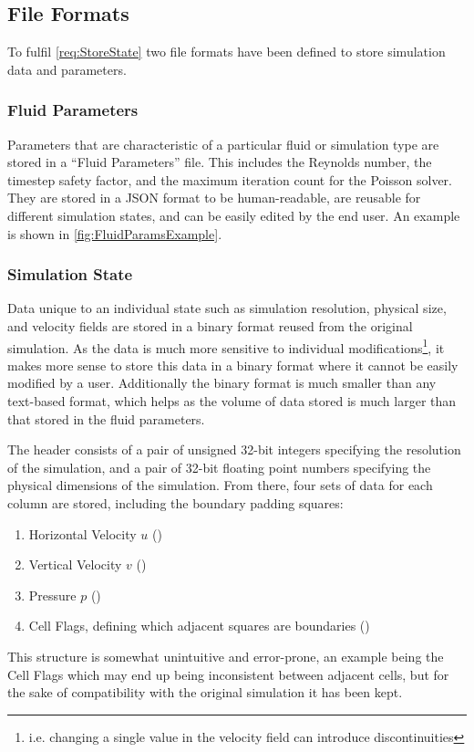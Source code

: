 \subsection{File Formats}\label{sec:FileFormat}
To fulfil \cref{req:StoreState} two file formats have been defined to store simulation data and parameters.

\subsubsection{Fluid Parameters}
Parameters that are characteristic of a particular fluid or simulation type are stored in a ``Fluid Parameters'' file.
This includes the Reynolds number, the timestep safety factor, and the maximum iteration count for the Poisson solver.
They are stored in a JSON format to be human-readable, are reusable for different simulation states, and can be easily edited by the end user.
An example is shown in \cref{fig:FluidParamsExample}.



\subsubsection{Simulation State}
Data unique to an individual state such as simulation resolution, physical size, and velocity fields are stored in a binary format reused from the original simulation.
As the data is much more sensitive to individual modifications\footnote{i.e. changing a single value in the velocity field can introduce discontinuities}, it makes more sense to store this data in a binary format where it cannot be easily modified by a user.
Additionally the binary format is much smaller than any text-based format, which helps as the volume of data stored is much larger than that stored in the fluid parameters.

The header consists of a pair of unsigned 32-bit integers specifying the resolution of the simulation, and a pair of 32-bit floating point numbers specifying the physical dimensions of the simulation.
From there, four sets of data for each column are stored, including the boundary padding squares:
\begin{enumerate}
    \item Horizontal Velocity $u$ ()
    \item Vertical Velocity $v$ ()
    \item Pressure $p$ ()
    \item Cell Flags, defining which adjacent squares are boundaries ()
\end{enumerate}
This structure is somewhat unintuitive and error-prone, an example being the Cell Flags which may end up being inconsistent between adjacent cells, but for the sake of compatibility with the original simulation it has been kept.
